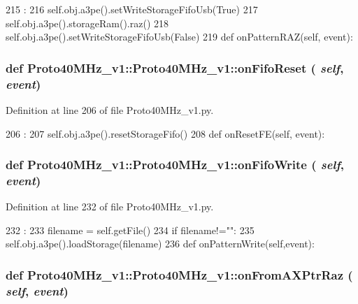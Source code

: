 \begin{DoxyCode}
215                               :
216         self.obj.a3pe().setWriteStorageFifoUsb(True)        
217         self.obj.a3pe().storageRam().raz()
218         self.obj.a3pe().setWriteStorageFifoUsb(False)
219 
    def onPatternRAZ(self, event):
\end{DoxyCode}
\hypertarget{classProto40MHz__v1_1_1Proto40MHz__v1_add921f5847ecb560827e51e877eccd53}{
\subsubsection[{onFifoReset}]{\setlength{\rightskip}{0pt plus 5cm}def Proto40MHz\_\-v1::Proto40MHz\_\-v1::onFifoReset ( {\em self}, \/   {\em event})}}
\label{classProto40MHz__v1_1_1Proto40MHz__v1_add921f5847ecb560827e51e877eccd53}


Definition at line 206 of file Proto40MHz\_\-v1.py.


\begin{DoxyCode}
206                                 :
207         self.obj.a3pe().resetStorageFifo()
208 
    def onResetFE(self, event):
\end{DoxyCode}
\hypertarget{classProto40MHz__v1_1_1Proto40MHz__v1_a75abff62477925a225bc1dc3cbdd9f9a}{
\subsubsection[{onFifoWrite}]{\setlength{\rightskip}{0pt plus 5cm}def Proto40MHz\_\-v1::Proto40MHz\_\-v1::onFifoWrite ( {\em self}, \/   {\em event})}}
\label{classProto40MHz__v1_1_1Proto40MHz__v1_a75abff62477925a225bc1dc3cbdd9f9a}


Definition at line 232 of file Proto40MHz\_\-v1.py.


\begin{DoxyCode}
232                                :
233         filename = self.getFile()
234         if filename!="":
235             self.obj.a3pe().loadStorage(filename)        
236 
    def onPatternWrite(self,event):
\end{DoxyCode}
\hypertarget{classProto40MHz__v1_1_1Proto40MHz__v1_a8635b417e8bdc7e65a5a9790f15d5763}{
\subsubsection[{onFromAXPtrRaz}]{\setlength{\rightskip}{0pt plus 5cm}def Proto40MHz\_\-v1::Proto40MHz\_\-v1::onFromAXPtrRaz ( {\em self}, \/   {\em event})}}
\label{classProto40MHz__v1_1_1Proto40MHz__v1_a8635b417e8bdc7e65a5a9790f15d5763}


